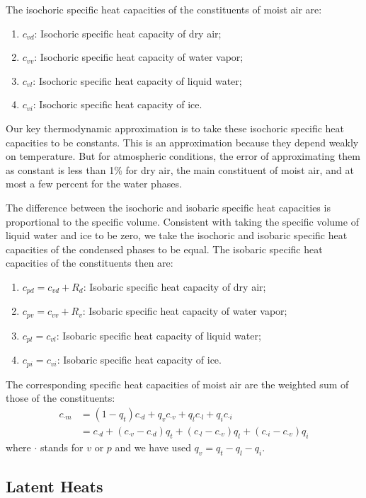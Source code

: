 \documentclass{report}
\begin{document}
The isochoric specific heat capacities of the constituents of moist air are:
\begin{enumerate}
    \item $c_{vd}$: Isochoric specific heat capacity of dry air;
    \item $c_{vv}$: Isochoric specific heat capacity of water vapor;
    \item $c_{vl}$: Isochoric specific heat capacity of liquid water;
    \item $c_{vi}$: Isochoric specific heat capacity of ice.
\end{enumerate}
Our key thermodynamic approximation is to take these isochoric specific heat capacities to be constants. This is an approximation because they depend weakly on temperature. But for atmospheric conditions, the error of approximating them as constant is less than 1\% for dry air, the main constituent of moist air, and at most a few percent for the water phases.

The difference between the isochoric and isobaric specific heat capacities is proportional to the specific volume. Consistent with taking the specific volume of liquid water and ice to be zero, we take the isochoric and isobaric specific heat capacities of the condensed phases to be equal. The isobaric specific heat capacities of the constituents then are:
\begin{enumerate}
    \item $c_{pd} = c_{vd} + R_d$: Isobaric specific heat capacity of dry air;
    \item $c_{pv} = c_{vv} + R_v$: Isobaric specific heat capacity of water vapor;
    \item $c_{pl} = c_{vl}$: Isobaric specific heat capacity of liquid water;
    \item $c_{pi} = c_{vi}$: Isobaric specific heat capacity of ice.
\end{enumerate}

The corresponding specific heat capacities of moist air are the weighted sum of those of the constituents:
\begin{align}
    c_{\cdot m} & = (1-q_t) c_{\cdot d} + q_v c_{\cdot v} + q_l c_{\cdot l} + q_i c_{\cdot i}\\
    & = c_{\cdot d} + (c_{\cdot v} - c_{\cdot d})q_t + (c_{\cdot l} - c_{\cdot v})q_l + (c_{\cdot i} - c_{\cdot v})q_i
\end{align}
where $\cdot$ stands for $v$ or $p$ and we have used $q_v = q_t -q_l - q_i$.

\subsection{Latent Heats}
\end{document}
